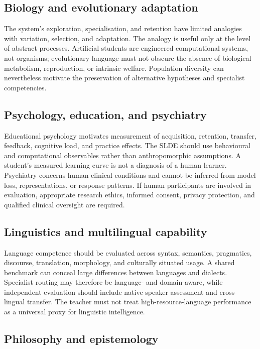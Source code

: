 \documentclass[11pt,a4paper]{article}
\begin{document}
\subsection{Biology and evolutionary adaptation}

The system's exploration, specialisation, and retention have limited analogies with variation, selection, and adaptation. The analogy is useful only at the level of abstract processes. Artificial students are engineered computational systems, not organisms; evolutionary language must not obscure the absence of biological metabolism, reproduction, or intrinsic welfare. Population diversity can nevertheless motivate the preservation of alternative hypotheses and specialist competencies.

\subsection{Psychology, education, and psychiatry}

Educational psychology motivates measurement of acquisition, retention, transfer, feedback, cognitive load, and practice effects. The SLDE should use behavioural and computational observables rather than anthropomorphic assumptions. A student's measured learning curve is not a diagnosis of a human learner. Psychiatry concerns human clinical conditions and cannot be inferred from model loss, representations, or response patterns. If human participants are involved in evaluation, appropriate research ethics, informed consent, privacy protection, and qualified clinical oversight are required.

\subsection{Linguistics and multilingual capability}

Language competence should be evaluated across syntax, semantics, pragmatics, discourse, translation, morphology, and culturally situated usage. A shared benchmark can conceal large differences between languages and dialects. Specialist routing may therefore be language- and domain-aware, while independent evaluation should include native-speaker assessment and cross-lingual transfer. The teacher must not treat high-resource-language performance as a universal proxy for linguistic intelligence.

\subsection{Philosophy and epistemology}
\end{document}
